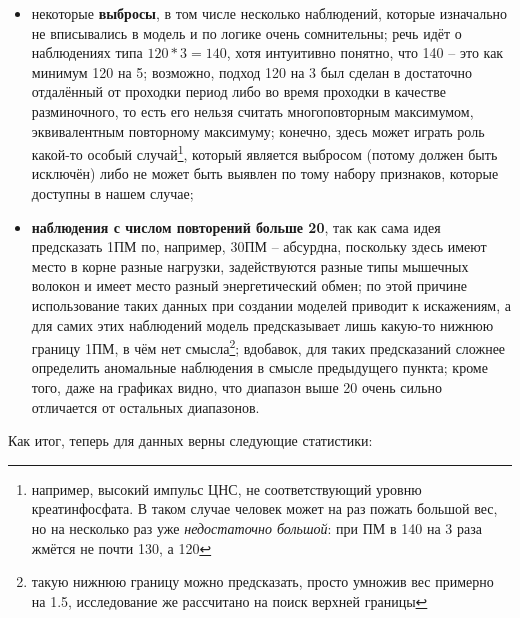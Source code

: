 \documentclass[
]{article}
\begin{document}
\begin{itemize}
\item
  некоторые \textbf{выбросы}, в том числе несколько наблюдений, которые
  изначально не вписывались в модель и по логике очень сомнительны; речь
  идёт о наблюдениях типа \(120*3=140\), хотя интуитивно понятно, что
  140 -- это как минимум 120 на 5; возможно, подход 120 на 3 был сделан
  в достаточно отдалённый от проходки период либо во время проходки в
  качестве разминочного, то есть его нельзя считать многоповторным
  максимумом, эквивалентным повторному максимуму; конечно, здесь может
  играть роль какой-то особый случай\footnote{например, высокий импульс
    ЦНС, не соответствующий уровню креатинфосфата. В таком случае
    человек может на раз пожать большой вес, но на несколько раз уже
    \emph{недостаточно большой}: при ПМ в 140 на 3 раза жмётся не почти
    130, а 120}, который является выбросом (потому должен быть исключён)
  либо не может быть выявлен по тому набору признаков, которые доступны
  в нашем случае;
\item
  \textbf{наблюдения с числом повторений больше 20}, так как сама идея
  предсказать 1ПМ по, например, 30ПМ -- абсурдна, поскольку здесь имеют
  место в корне разные нагрузки, задействуются разные типы мышечных
  волокон и имеет место разный энергетический обмен; по этой причине
  использование таких данных при создании моделей приводит к искажениям,
  а для самих этих наблюдений модель предсказывает лишь какую-то нижнюю
  границу 1ПМ, в чём нет смысла\footnote{такую нижнюю границу можно
    предсказать, просто умножив вес примерно на 1.5, исследование же
    рассчитано на поиск верхней границы}; вдобавок, для таких
  предсказаний сложнее определить аномальные наблюдения в смысле
  предыдущего пункта; кроме того, даже на графиках видно, что диапазон
  выше 20 очень сильно отличается от остальных диапазонов.
\end{itemize}

Как итог, теперь для данных верны следующие статистики:
\end{document}
